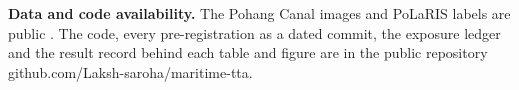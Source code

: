 \documentclass[journal]{IEEEtran}
\begin{document}
\textbf{Data and code availability.} The Pohang Canal images and PoLaRIS labels are public \cite{chung2023pohang,choi2025polaris}. The code, every pre-registration as a dated commit, the exposure ledger and the result record behind each table and figure are in the public repository github.com/Laksh-saroha/maritime-tta.

\FloatBarrier


\end{document}

